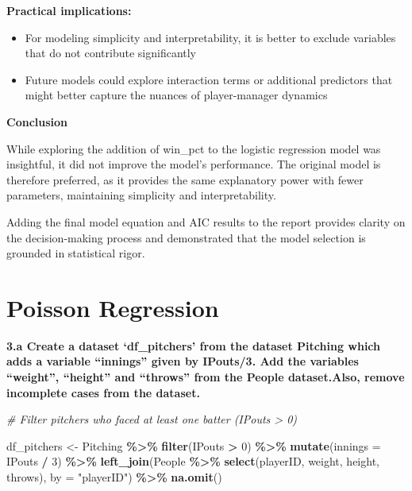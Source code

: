\documentclass[
]{article}
\newenvironment{Shaded}{\begin{snugshade}}{\end{snugshade}}
\newcommand{\AttributeTok}[1]{\textcolor[rgb]{0.13,0.29,0.53}{#1}}
\newcommand{\CommentTok}[1]{\textcolor[rgb]{0.56,0.35,0.01}{\textit{#1}}}
\newcommand{\DecValTok}[1]{\textcolor[rgb]{0.00,0.00,0.81}{#1}}
\newcommand{\FunctionTok}[1]{\textcolor[rgb]{0.13,0.29,0.53}{\textbf{#1}}}
\newcommand{\NormalTok}[1]{#1}
\newcommand{\OtherTok}[1]{\textcolor[rgb]{0.56,0.35,0.01}{#1}}
\newcommand{\SpecialCharTok}[1]{\textcolor[rgb]{0.81,0.36,0.00}{\textbf{#1}}}
\newcommand{\StringTok}[1]{\textcolor[rgb]{0.31,0.60,0.02}{#1}}
\begin{document}
\textbf{Practical implications:}

\begin{itemize}
\item
  For modeling simplicity and interpretability, it is better to exclude
  variables that do not contribute significantly
\item
  Future models could explore interaction terms or additional predictors
  that might better capture the nuances of player-manager dynamics
\end{itemize}

\textbf{Conclusion}

While exploring the addition of win\_pct to the logistic regression
model was insightful, it did not improve the model's performance. The
original model is therefore preferred, as it provides the same
explanatory power with fewer parameters, maintaining simplicity and
interpretability.

Adding the final model equation and AIC results to the report provides
clarity on the decision-making process and demonstrated that the model
selection is grounded in statistical rigor.

\section{Poisson Regression}\label{poisson-regression}

\textbf{3.a Create a dataset `df\_pitchers' from the dataset Pitching
which adds a variable ``innings'' given by IPouts/3. Add the variables
``weight'', ``height'' and ``throws'' from the People dataset.Also,
remove incomplete cases from the dataset.}

\begin{Shaded}
\begin{Highlighting}[]
\CommentTok{\# Filter pitchers who faced at least one batter (IPouts \textgreater{} 0)}

\NormalTok{df\_pitchers }\OtherTok{\textless{}{-}}\NormalTok{ Pitching }\SpecialCharTok{\%\textgreater{}\%}
  \FunctionTok{filter}\NormalTok{(IPouts }\SpecialCharTok{\textgreater{}} \DecValTok{0}\NormalTok{) }\SpecialCharTok{\%\textgreater{}\%}
  \FunctionTok{mutate}\NormalTok{(}\AttributeTok{innings =}\NormalTok{ IPouts }\SpecialCharTok{/} \DecValTok{3}\NormalTok{) }\SpecialCharTok{\%\textgreater{}\%}
  \FunctionTok{left\_join}\NormalTok{(People }\SpecialCharTok{\%\textgreater{}\%} \FunctionTok{select}\NormalTok{(playerID, weight, height, throws), }\AttributeTok{by =} \StringTok{"playerID"}\NormalTok{) }\SpecialCharTok{\%\textgreater{}\%}
  \FunctionTok{na.omit}\NormalTok{()}
\end{Highlighting}
\end{Shaded}
\end{document}
